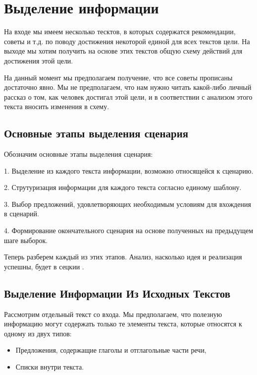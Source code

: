 \documentclass[12pt]{article}
\begin{document}
\tableofcontents
\newpage

\section{Выделение информации}

На входе мы имеем несколько тесктов, в которых содержатся рекомендации, советы и т.д. по поводу достижения некоторой единой для всех текстов цели. На выходе мы хотим получить на основе этих текстов общую схему действий для достижения этой цели.

На данный момент мы предполагаем получение, что все советы прописаны достаточно явно. Мы не предполагаем, что нам нужно читать какой-либо личный рассказ о том, как человек достигал этой цели, и в соответствии с анализом этого текста вносить изменения в схему.

\subsection{Основные этапы выделения сценария}
\label{marker1}
Обозначим основные этапы выделения сценария:

1. Выделение из каждого текста информации, возможно относящейся к сценарию.

2. Струтуризация информации для каждого текста согласно единому шаблону.

3. Выбор предложений, удовлетворяющих необходимым условиям для вхождения в сценарий.

4. Формирование окончательного сценария на основе полученных на предыдущем шаге выборок.

Теперь разберем каждый из этих этапов. Анализ, насколько идея и реализация успешны, будет в сецкии .

\subsection{Выделение Информации Из Исходных Текстов}
\label{marker2}

Рассмотрим отдельный текст со входа. Мы предполагаем, что полезную информацию могут содержать только те элементы текста, которые относятся к одному из двух типов:

\begin{itemize}
	\item Предложения, содержащие глаголы и отглагольные части речи,
	\item Списки внутри текста.
\end{itemize} 
\end{document}
